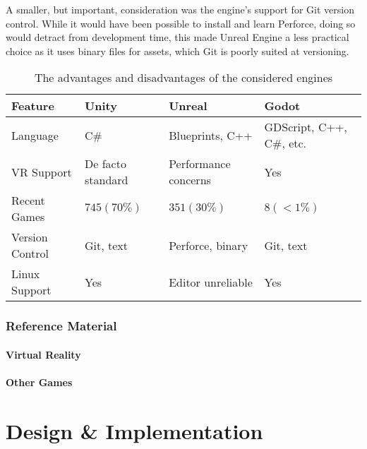 \documentclass[sigconf,authordraft]{acmart}
\begin{document}
A smaller, but important, consideration was the engine's support for Git version
control. While it would have been possible to install and learn Perforce, doing
so would detract from development time, this made Unreal Engine a less practical
choice as it uses binary files for assets, which Git is poorly suited at
versioning.

\begin{table*}
  \caption{The advantages and disadvantages of the considered engines}
  \label{table:engine_compare}
  \begin{tabular}{llll}\toprule
    Feature & Unity & Unreal & Godot \\\midrule

    Language & C\# & Blueprints, C++ & GDScript, C++, C\#, etc. \\
    VR Support & De facto standard & Performance concerns & Yes \\
    Recent Games & $745 (70\%)$ & $351 (30\%)$ & $8 (<1\%)$ \\
    Version Control & Git, text & Perforce, binary & Git, text \\
    Linux Support & Yes & Editor unreliable & Yes \\

    \bottomrule
  \end{tabular}
\end{table*}

\subsubsection{Reference Material}

\paragraph{Virtual Reality}


\paragraph{Other Games}

\section{Design \& Implementation}
\end{document}
